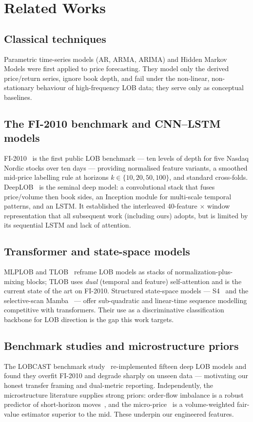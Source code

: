 \documentclass[fonts]{icst}
\begin{document}
\section{Related Works}
\subsection{Classical techniques}
Parametric time-series models (AR, ARMA, ARIMA) and Hidden Markov Models were first applied to price
forecasting. They model only the derived price/return series, ignore book depth, and fail under the
non-linear, non-stationary behaviour of high-frequency LOB data; they serve only as conceptual baselines.

\subsection{The FI-2010 benchmark and CNN--LSTM models}
FI-2010~\cite{fi2010} is the first public LOB benchmark --- ten levels of depth for five Nasdaq Nordic stocks
over ten days --- providing normalised feature variants, a smoothed mid-price labelling rule at horizons
$k\in\{10,20,50,100\}$, and standard cross-folds. DeepLOB~\cite{deeplob} is the seminal deep model: a
convolutional stack that fuses price/volume then book sides, an Inception module for multi-scale temporal
patterns, and an LSTM. It established the interleaved 40-feature $\times$ window representation that all
subsequent work (including ours) adopts, but is limited by its sequential LSTM and lack of attention.

\subsection{Transformer and state-space models}
MLPLOB and TLOB~\cite{tlob} reframe LOB models as stacks of normalization-plus-mixing blocks; TLOB uses
\emph{dual} (temporal and feature) self-attention and is the current state of the art on FI-2010. Structured
state-space models --- S4~\cite{s4} and the selective-scan Mamba~\cite{mamba} --- offer sub-quadratic and
linear-time sequence modelling competitive with transformers. Their use as a discriminative classification
backbone for LOB direction is the gap this work targets.

\subsection{Benchmark studies and microstructure priors}
The LOBCAST benchmark study~\cite{lobcast} re-implemented fifteen deep LOB models and found they overfit
FI-2010 and degrade sharply on unseen data --- motivating our honest transfer framing and dual-metric
reporting. Independently, the microstructure literature supplies strong priors: order-flow imbalance is a
robust predictor of short-horizon moves~\cite{ofi}, and the micro-price~\cite{microprice} is a volume-weighted
fair-value estimator superior to the mid. These underpin our engineered features.
\end{document}

